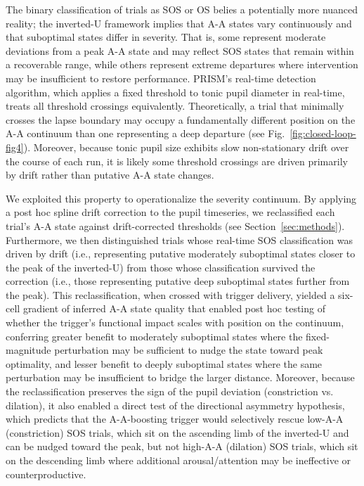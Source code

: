 The binary classification of trials as SOS or OS belies a potentially more nuanced reality; the inverted-U framework implies that A-A states vary continuously and that suboptimal states differ in severity. That is, some represent moderate deviations from a peak A-A state and may reflect SOS states that remain within a recoverable range, while others represent extreme departures where intervention may be insufficient to restore performance. PRISM's real-time detection algorithm, which applies a fixed threshold to tonic pupil diameter in real-time, treats all threshold crossings equivalently. Theoretically, a trial that minimally crosses the lapse boundary may occupy a fundamentally different position on the A-A continuum than one representing a deep departure (see Fig.~\ref{fig:closed-loop-fig4}). Moreover, because tonic pupil size exhibits slow non-stationary drift over the course of each run, it is likely some threshold crossings are driven primarily by drift rather than putative A-A state changes.

We exploited this property to operationalize the severity continuum. By applying a post hoc spline drift correction to the pupil timeseries, we reclassified each trial's A-A state against drift-corrected thresholds (see Section~\ref{sec:methods}). Furthermore, we then distinguished trials whose real-time SOS classification was driven by drift (i.e., representing putative moderately suboptimal states closer to the peak of the inverted-U) from those whose classification survived the correction (i.e., those representing putative deep suboptimal states further from the peak). This reclassification, when crossed with trigger delivery, yielded a six-cell gradient of inferred A-A state quality that enabled post hoc testing of whether the trigger's functional impact scales with position on the continuum, conferring greater benefit to moderately suboptimal states where the fixed-magnitude perturbation may be sufficient to nudge the state toward peak optimality, and lesser benefit to deeply suboptimal states where the same perturbation may be insufficient to bridge the larger distance. Moreover, because the reclassification preserves the sign of the pupil deviation (constriction vs. dilation), it also enabled a direct test of the directional asymmetry hypothesis, which predicts that the A-A-boosting trigger would selectively rescue low-A-A (constriction) SOS trials, which sit on the ascending limb of the inverted-U and can be nudged toward the peak, but not high-A-A (dilation) SOS trials, which sit on the descending limb where additional arousal/attention may be ineffective or counterproductive.

